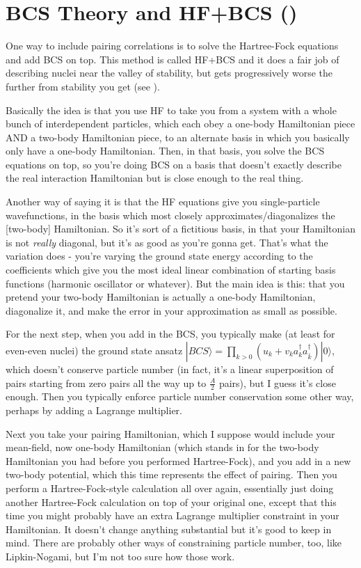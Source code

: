 \section*{BCS Theory and HF+BCS (\cite{suhonen2007nucleons,Anguiano2013})}
One way to include pairing correlations is to solve the Hartree-Fock equations and add BCS on top. This method is called HF+BCS and it does a fair job of describing nuclei near the valley of stability, but gets progressively worse the further from stability you get (see \cite{Anguiano2013}).

Basically the idea is that you use HF to take you from a system with a whole bunch of interdependent particles, which each obey a one-body Hamiltonian piece AND a two-body Hamiltonian piece, to an alternate basis in which you basically only have a one-body Hamiltonian. Then, in that basis, you solve the BCS equations on top, so you're doing BCS on a basis that doesn't exactly describe the real interaction Hamiltonian but is close enough to the real thing.

Another way of saying it is that the HF equations give you single-particle wavefunctions, in the basis which most closely approximates/diagonalizes the [two-body] Hamiltonian. So it's sort of a fictitious basis, in that your Hamiltonian is not \textit{really} diagonal, but it's as good as you're gonna get. That's what the variation does - you're varying the ground state energy according to the coefficients which give you the most ideal linear combination of starting basis functions (harmonic oscillator or whatever). But the main idea is this: that you pretend your two-body Hamiltonian is actually a one-body Hamiltonian, diagonalize it, and make the error in your approximation as small as possible.

For the next step, when you add in the BCS, you typically make (at least for even-even nuclei) the ground state ansatz $|BCS\rangle = \prod_{k>0}(u_k+v_k a_k^\dagger a_{\bar{k}}^\dagger)|0\rangle$, which doesn't conserve particle number (in fact, it's a linear superposition of pairs starting from zero pairs all the way up to $\frac{A}{2}$ pairs), but I guess it's close enough. Then you typically enforce particle number conservation some other way, perhaps by adding a Lagrange multiplier.

Next you take your pairing Hamiltonian, which I suppose would include your mean-field, now one-body Hamiltonian (which stands in for the two-body Hamiltonian you had before you performed Hartree-Fock), and you add in a new two-body potential, which this time represents the effect of pairing. Then you perform a Hartree-Fock-style calculation all over again, essentially just doing another Hartree-Fock calculation on top of your original one, except that this time you might probably have an extra Lagrange multiplier constraint in your Hamiltonian. It doesn't change anything substantial but it's good to keep in mind. There are probably other ways of constraining particle number, too, like Lipkin-Nogami, but I'm not too sure how those work.

